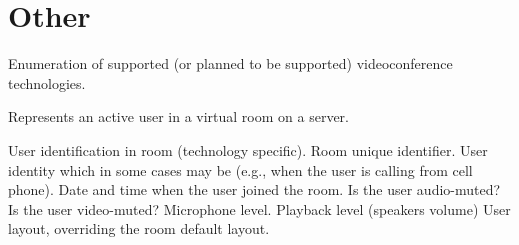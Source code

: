 \section{Other} \label{sect:common:other}

\begin{Api}

Enumeration of supported (or planned to be supported) videoconference technologies.
\begin{ApiEnumValues}
\end{ApiEnumValues}

Represents an active user in a virtual room on a server.
\begin{ApiClassAttributes}
User identification in room (technology specific).
Room unique identifier. 
User identity which in some cases may be  (e.g., when the user is calling from cell phone).
 Date and time when the user joined the room.
Is the user audio-muted?
Is the user video-muted?
Microphone level.
Playback level (speakers volume)
User layout, overriding the room default layout.
\end{ApiClassAttributes}

\end{Api}

